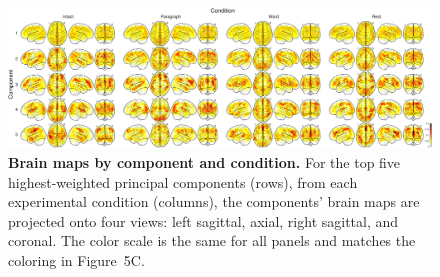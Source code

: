 \documentclass[english]{article}
\newcommand{\neurosynth}{5}
\begin{document}
\begin{figure}[t]
  \centering
  \includegraphics[width=\textwidth]{figs/component_brain_maps}

\caption{\textbf{Brain maps by component and condition.} For the top five
highest-weighted principal components (rows), from each experimental condition
(columns), the components' brain maps are projected onto four views: left
sagittal, axial, right sagittal, and coronal. The color scale is the same for
all panels and matches the coloring in Figure~\neurosynth C.}

\label{fig:components}
\end{figure}
\end{document}
